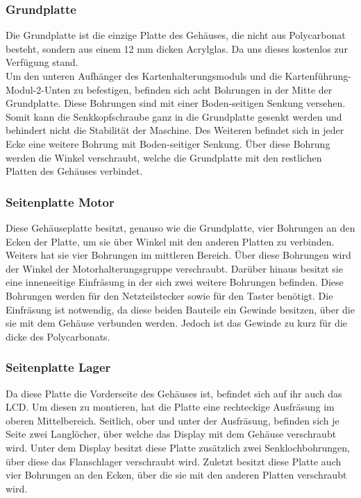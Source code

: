 \subsubsection{Grundplatte}
Die Grundplatte ist die einzige Platte des Gehäuses, die nicht aus Polycarbonat besteht, sondern aus einem 12 mm dicken
Acrylglas.
Da uns dieses kostenlos zur Verfügung stand.\\
Um den unteren Aufhänger des Kartenhalterungsmoduls und die Kartenführung-Modul-2-Unten zu befestigen, befinden sich acht
Bohrungen in der Mitte der Grundplatte.
Diese Bohrungen sind mit einer Boden-seitigen Senkung versehen.
Somit kann die Senkkopfschraube ganz in die Grundplatte gesenkt werden und behindert nicht die Stabilität der Maschine.
Des Weiteren befindet sich in jeder Ecke eine weitere Bohrung mit Boden-seitiger Senkung.
Über diese Bohrung werden die Winkel verschraubt, welche die Grundplatte mit den restlichen Platten des Gehäuses verbindet.

\subsubsection{Seitenplatte Motor}
Diese Gehäuseplatte besitzt, genauso wie die Grundplatte, vier Bohrungen an den Ecken der Platte, um sie über Winkel
mit den anderen Platten zu verbinden.
Weiters hat sie vier Bohrungen im mittleren Bereich.
Über diese Bohrungen wird der Winkel der Motorhalterungsgruppe verschraubt.
Darüber hinaus besitzt sie eine innenseitige Einfräsung in der sich
zwei weitere Bohrungen befinden.
Diese Bohrungen werden für den Netzteilstecker sowie für den Taster benötigt.
Die Einfräsung ist notwendig, da diese beiden Bauteile ein Gewinde besitzen, über die sie mit dem Gehäuse verbunden werden.
Jedoch ist das Gewinde zu kurz für die dicke des Polycarbonats.

\subsubsection{Seitenplatte Lager}
Da diese Platte die Vorderseite des Gehäuses ist, befindet sich auf ihr auch das LCD.
Um diesen zu montieren, hat die Platte eine rechteckige Ausfräsung im oberen Mittelbereich.
Seitlich, ober und unter der Ausfräsung, befinden sich je Seite zwei Langlöcher, über welche das Display mit dem Gehäuse verschraubt wird.
Unter dem Display besitzt diese Platte zusätzlich zwei Senklochbohrungen, über diese das Flanschlager verschraubt wird.
Zuletzt besitzt diese Platte auch vier Bohrungen an den Ecken, über die sie mit den anderen Platten verschraubt wird.

